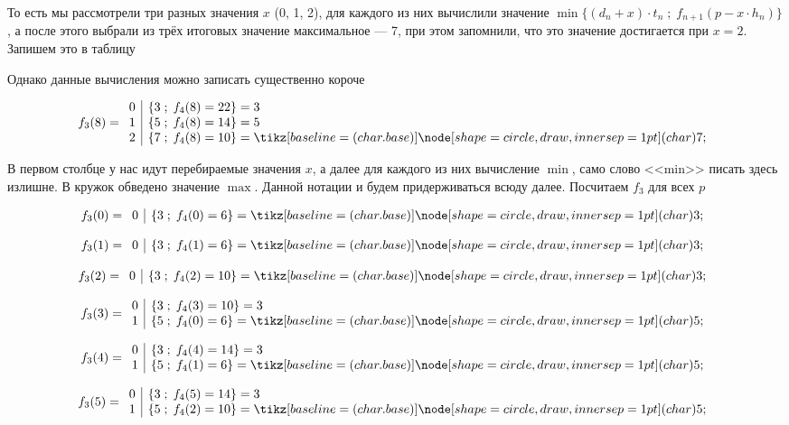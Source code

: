 \begin{enumerate}
	То есть мы рассмотрели три разных значения $x$ (0, 1, 2), для каждого из них вычислили значение $\min\Big\{(d_n + x) \cdot t_n \; ; \; f_{n+1}(p - x \cdot h_n)\Big\}$, а после этого выбрали из трёх итоговых значение максимальное --- 7, при этом запомнили, что это значение достигается при $x = 2$. Запишем это в таблицу
	
	
	
	Однако данные вычисления можно записать существенно короче

	\[
		f_3(8) = \begin{array}{c|l}
			0 & \{3 \; ; \; f_4(8) = 22\} = 3 \\
			1 & \{5 \; ; \; f_4(8) = 14\} = 5 \\
			2 & \{7 \; ; \; f_4(8) = 10\} = \circled{7}
		\end{array}
	\]

	В первом столбце у нас идут перебираемые значения $x$, а далее для каждого из них вычисление $\min$, само слово <<min>> писать здесь излишне. В кружок обведено значение $\max$. Данной нотации и будем придерживаться всюду далее. Посчитаем $f_3$ для всех $p$
	
	\[
		f_3(0) = \begin{array}{c|l}
			0 & \{3 \; ; \; f_4(0) = 6\} = \circled{3}
		\end{array}
	\]
	
	\[
		f_3(1) = \begin{array}{c|l}
			0 & \{3 \; ; \; f_4(1) = 6\} = \circled{3}
		\end{array}
	\]
	
	\[
		f_3(2) = \begin{array}{c|l}
			0 & \{3 \; ; \; f_4(2) = 10\} = \circled{3}
		\end{array}
	\]
	
	\[
		f_3(3) = \begin{array}{c|l}
			0 & \{3 \; ; \; f_4(3) = 10\} = 3 \\
			1 & \{5 \; ; \; f_4(0) = 6\} = \circled{5}
		\end{array}
	\]
	
	\[
		f_3(4) = \begin{array}{c|l}
			0 & \{3 \; ; \; f_4(4) = 14\} = 3 \\
			1 & \{5 \; ; \; f_4(1) = 6\} = \circled{5}
		\end{array}
	\]
	
	\[
		f_3(5) = \begin{array}{c|l}
			0 & \{3 \; ; \; f_4(5) = 14\} = 3 \\
			1 & \{5 \; ; \; f_4(2) = 10\} = \circled{5}
		\end{array}
	\]
	

\end{enumerate}
